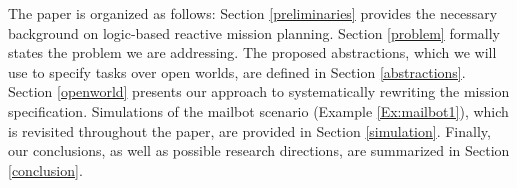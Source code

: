 The paper is organized as follows: Section \ref{preliminaries} provides the necessary background on logic-based reactive mission planning. Section \ref{problem} formally states the problem we are addressing. The proposed abstractions, which we will use to specify tasks over open worlds, are defined in Section \ref{abstractions}. Section \ref{openworld} presents our approach to systematically rewriting the mission specification. Simulations of the mailbot scenario (Example \ref{Ex:mailbot1}), which is revisited throughout the paper, are provided in Section \ref{simulation}. Finally, our conclusions, as well as possible research directions, are summarized in Section \ref{conclusion}.

